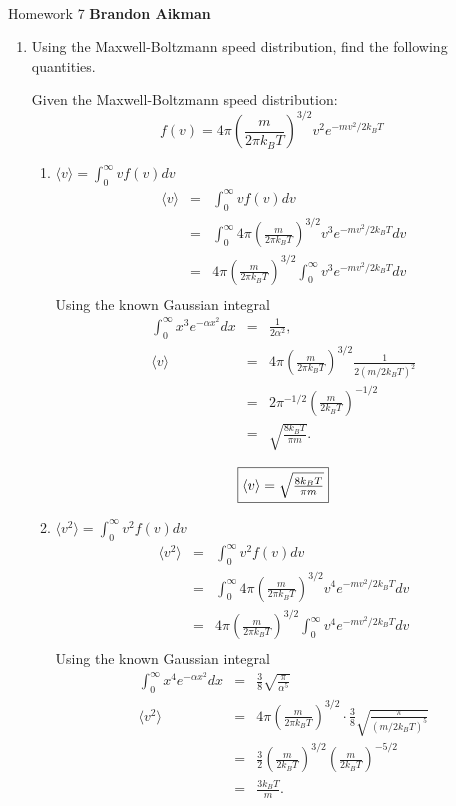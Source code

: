 \documentclass[12pt]{article}
\begin{document}
 \\
Homework 7 \hfill {\bf Brandon Aikman}

\begin{enumerate}
	\item Using the Maxwell-Boltzmann speed distribution, find the following quantities.

	Given the Maxwell-Boltzmann speed distribution:
	$$f(v) = 4\pi \left(\frac{m}{2\pi k_B T}\right)^{3/2} v^2 e^{-mv^2/2k_BT}$$

	\begin{enumerate}
		\item $\langle v \rangle = \int_0^{\infty} v f(v)  dv$
        \begin{eqnarray*}
            \langle v \rangle &=& \int_0^\infty v f(v) dv \\
            &=& \int_0^\infty 4\pi \left(\frac{m}{2\pi k_B T}\right)^{3/2} v^3 e^{-mv^2/2k_B T} dv \\
            &=& 4\pi \left(\frac{m}{2\pi k_B T}\right)^{3/2} \int_0^\infty v^3 e^{-mv^2/2k_B T} dv \\
        \end{eqnarray*}
        Using the known Gaussian integral
        \begin{eqnarray*}
            \int_0^\infty x^3 e^{-\alpha x^2} dx &=& \frac{1}{2\alpha^2}, \\
            \langle v \rangle &=& 4\pi \left(\frac{m}{2\pi k_B T}\right)^{3/2} \frac{1}{2\left(m/2k_B T\right)^2} \\
            &=& 2\pi^{-1/2} \left(\frac{m}{2k_B T}\right)^{-1/2} \\
            &=& \sqrt{\frac{8 k_B T}{\pi m}}.
        \end{eqnarray*}

        $$\fbox{$\langle v \rangle = \sqrt{\frac{8 k_B T}{\pi m}}$}$$
 
		\item $\langle v^2 \rangle = \int_0^{\infty} v^2 f(v) dv$
        \begin{eqnarray*}
            \langle v^2 \rangle &=& \int_0^\infty v^2 f(v) dv \\
            &=& \int_0^\infty 4\pi \left(\frac{m}{2\pi k_B T}\right)^{3/2} v^4 e^{-mv^2/2k_B T} dv \\
            &=& 4\pi \left(\frac{m}{2\pi k_B T}\right)^{3/2} \int_0^\infty v^4 e^{-mv^2/2k_B T} dv \\
        \end{eqnarray*}
        Using the known Gaussian integral
        \begin{eqnarray*}
            \int_0^\infty x^4 e^{-\alpha x^2} dx &=& \frac{3}{8}\sqrt{\frac{\pi}{\alpha^5}} \\
            \langle v^2 \rangle &=& 4\pi \left(\frac{m}{2\pi k_B T}\right)^{3/2} \cdot \frac{3}{8}\sqrt{\frac{\pi}{(m/2k_B T)^5}} \\
            &=& \frac{3}{2} \left(\frac{m}{2k_B T}\right)^{3/2} \left(\frac{m}{2k_B T}\right)^{-5/2} \\
            &=& \frac{3k_B T}{m}.
        \end{eqnarray*}


\end{enumerate}
\end{enumerate}
\end{document}
